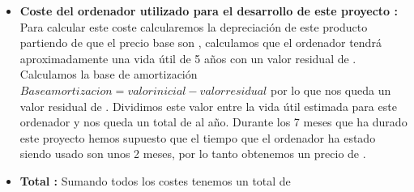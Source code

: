 \begin{itemize}
	\item\textbf{Coste del ordenador utilizado para el desarrollo de este proyecto :} Para calcular este coste calcularemos la depreciación \cite{depreciacion} de este producto partiendo de que el precio base son , calculamos que el ordenador tendrá aproximadamente una vida útil de 5 años con un valor residual de . Calculamos la base de amortización $ Base amortizacion = valor inicial - valor residual $    por lo que nos queda un valor residual de . Dividimos este valor entre la vida útil estimada para este ordenador y nos queda un total de  al año. Durante los 7 meses que ha durado este proyecto hemos supuesto que el tiempo que el ordenador ha estado siendo usado son unos 2 meses, por lo tanto obtenemos un precio de \textbf{}.
	
	\item\textbf{Total :} Sumando todos los costes tenemos un total de \textbf{}
	
\end{itemize}